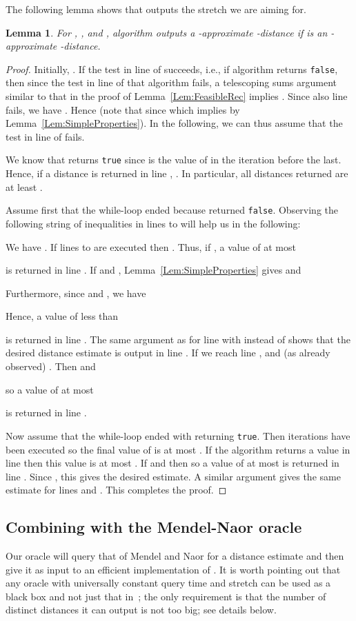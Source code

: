 \documentclass[11pt]{article}
\newtheorem{Lem}{Lemma}
\begin{document}
The following lemma shows that  outputs the stretch we are aiming for.
\begin{Lem}\label{Lem:Generic}
For , , and , algorithm  outputs a
-approximate -distance if  is an -approximate -distance.
\end{Lem}
\begin{proof}
Initially, . If the test in line  of
 succeeds, i.e., if algorithm  returns \texttt{false}, then
since the test in line  of that algorithm fails, a telescoping
sums argument similar to that in the proof of
Lemma~\ref{Lem:FeasibleRec} implies
. Since also line
 fails, we have
.
Hence 
(note that  since  which implies  by
Lemma~\ref{Lem:SimpleProperties}). In the following, we can thus assume
that the test in line  of  fails.

We know that  returns \texttt{true} since  is the value of  in the iteration before the last.
Hence, if a distance is returned in line , . In particular, all distances returned are at least
.

Assume first that the while-loop ended because  returned \texttt{false}. Observing the following string
of inequalities in lines  to  will help us in the following:

We have . If lines  to  are executed then
. Thus,
if , a value of at most

is returned in line . If  and , Lemma~\ref{Lem:SimpleProperties} gives 
and

Furthermore, since  and , we have

Hence, a value of less than

is returned in line . The same argument as for line 
with  instead of  shows that the desired distance estimate is output
in line . If we reach line ,  and (as already observed) .
Then  and

so a value of at most

is returned in line .

Now assume that the while-loop ended with  returning \texttt{true}.
Then  iterations have been executed so
the final value of  is at most
. If the algorithm returns a value in line  then
this value is at most
.
If  and  then
 so a value of at most
 is returned in line
. Since , this gives the desired estimate. A similar argument gives the same estimate for lines  and .
This completes the proof.
\end{proof}

\subsection{Combining with the Mendel-Naor oracle}\label{subsec:MendelNaor}
Our oracle will query that of Mendel and Naor for a distance estimate and then give it as input to an efficient implementation of
. It is worth pointing out that any oracle with universally constant
query time and  stretch can be used as a black box and not just that
in~\cite{MendelNaor}; the only requirement
is that the number of distinct distances it can output is not too big; see
details below.
\end{document}
